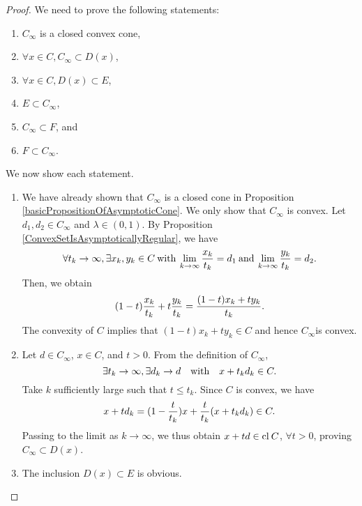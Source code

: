 \documentclass[a4paper,11pt, oneside]{book}
\theoremstyle{definition}
\newcommand{\Closure}[1]{\text{\rm cl\:${#1}$}} %
\begin{document}
\begin{proof}
  We need to prove the following statements:
  \begin{enumerate}[label=\roman*,align=CenterWithParen]
    \item $C_{\infty}$ is a closed convex cone,
    \item $\forall x \in C, C_{\infty} \subset D(x)$,
    \item $\forall x \in C, D(x) \subset E$,
    \item $E \subset C_{\infty}$,
    \item $C_{\infty} \subset F$, and
    \item $F \subset C_{\infty}$.
  \end{enumerate}
  We now show each statement.
  \begin{enumerate}[label=\roman*,align=CenterWithParen]
    \item We have already shown that $C_{\infty}$ is a closed cone in Proposition \ref{basicPropositionOfAsymptoticCone}. We only show that $C_{\infty}$ is convex. Let $d_1, d_2 \in C_{\infty}$ and $\lambda \in (0,1)$. By Proposition \ref{ConvexSetIsAsymptoticallyRegular}, we have
    \begin{equation}
      \forall t_k \to \infty, \exists x_k, y_k \in C \:\text{with}\: \lim_{k \to \infty} \frac{x_k}{t_k} = d_1 \: \text{and}\: \lim_{k \to \infty} \frac{y_k}{t_k} = d_2. \notag
    \end{equation}
    Then, we obtain
    \begin{equation}
      (1-t)\frac{x_k}{t_k} + t \frac{y_k}{t_k} = \frac{(1-t)x_k+ty_k}{t_k}. \notag
    \end{equation}
    The convexity of $C$ implies that $(1-t)x_k+ty_k \in C$ and hence $C_{\infty}$is convex.
    \item Let $d \in C_{\infty}$, $x \in C$, and $t>0$. From the definition of $C_{\infty}$,
    \begin{equation}
      \exists t_k \to \infty, \exists d_k \to d \quad \text{with} \quad x+ t_k d_k \in C. \notag
    \end{equation}
    Take $k$ sufficiently large such that $t \leq t_k$. Since $C$ is convex, we have
    \begin{equation}
      x + t d_k = (1 - \frac{t}{t_k})x + \frac{t}{t_k}(x + t_k d_k) \in C. \notag
    \end{equation}
    Passing to the limit as $k \to \infty$, we thus obtain $x + td \in \Closure{C}$, $\forall t>0$, proving $C_{\infty} \subset D(x)$.
    \item The inclusion $D(x) \subset E$ is obvious.

\end{enumerate}
\end{proof}
\end{document}
